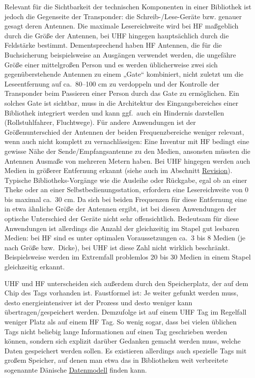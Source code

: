 \documentclass[
  11pt,
  letterpaper,
  DIV=11,
  twoside]{scrreprt}
\begin{document}
Relevant für die Sichtbarkeit der technischen Komponenten in einer
Bibliothek ist jedoch die Gegenseite der Transponder: die
Schreib-/Lese-Geräte bzw. genauer gesagt deren Antennen. Die maximale
Lesereichweite wird bei HF maßgeblich durch die Größe der Antennen, bei
UHF hingegen hauptsächlich durch die Feldstärke bestimmt.
Dementsprechend haben HF Antennen, die für die Buchsicherung
beispielsweise an Ausgängen verwendet werden, die ungefähre Größe einer
mittelgroßen Person und es werden üblicherweise zwei sich
gegenüberstehende Antennen zu einem „Gate`` kombiniert, nicht zuletzt um
die Leseentfernung auf ca.~80--100 cm zu verdoppeln und der Kontrolle
der Transponder beim Passieren einer Person durch das Gate zu
ermöglichen. Ein solches Gate ist sichtbar, muss in die Architektur des
Eingangsbereiches einer Bibliothek integriert werden und kann ggf.~auch
ein Hindernis darstellen (Rollstuhlfahrer, Fluchtwege). Für andere
Anwendungen ist der Größenunterschied der Antennen der beiden
Frequenzbereiche weniger relevant, wenn auch nicht komplett zu
vernachlässigen: Eine Inventur mit HF bedingt eine gewisse Nähe der
Sende/Empfangsantenne zu den Medien, ansonsten müssten die Antennen
Ausmaße von mehreren Metern haben. Bei UHF hingegen werden auch Medien
in größerer Entfernung erkannt (siehe auch im Abschnitt
\hyperref[revision]{Revision}). Typische Bibliotheks-Vorgänge wie die
Ausleihe oder Rückgabe, egal ob an einer Theke oder an einer
Selbstbedienungsstation, erfordern eine Lesereichweite von 0 bis maximal
ca.~30 cm. Da sich bei beiden Frequenzen für diese Entfernung eine in
etwa ähnliche Größe der Antennen ergibt, ist bei diesen Anwendungen der
optische Unterschied der Geräte nicht sehr offensichtlich. Bedeutsam für
diese Anwendungen ist allerdings die Anzahl der gleichzeitig im Stapel
gut lesbaren Medien: bei HF sind es unter optimalen Voraussetzungen
ca.~3 bis 8 Medien (je nach Größe bzw.~Dicke), bei UHF ist diese Zahl
nicht wirklich beschränkt. Beispielsweise werden im Extremfall
problemlos 20 bis 30 Medien in einem Stapel gleichzeitig erkannt.

UHF und HF unterscheiden sich außerdem durch den Speicherplatz, der auf
dem Chip des Tags vorhanden ist. Faustformel ist: Je weiter gefunkt
werden muss, desto energieintensiver ist der Prozess und desto weniger
kann übertragen/gespeichert werden. Demzufolge ist auf einem UHF Tag im
Regelfall weniger Platz als auf einem HF Tag. So wenig sogar, dass bei
vielen üblichen Tags nicht beliebig lange Informationen auf einen Tag
geschrieben werden können, sondern sich explizit darüber Gedanken
gemacht werden muss, welche Daten gespeichert werden sollen. Es
existieren allerdings auch spezielle Tags mit großem Speicher, auf denen
man etwa das in Bibliotheken weit verbreitete sogenannte Dänische
\hyperref[datenmodelle]{Datenmodell} finden kann.
\end{document}
